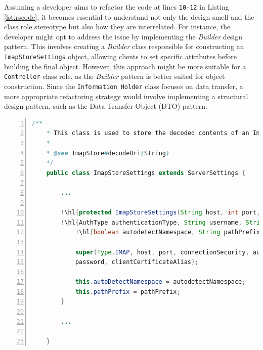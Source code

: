 \documentclass[AMA,Times1COL]{WileyNJDv5} %
\begin{document}
Assuming a developer aims to refactor the code at lines {\tt 10-12} in Listing \ref{lst:rscode}, it becomes essential to understand not only the design smell and the class role stereotype but also how they are interrelated. For instance, the developer might opt to address the issue by implementing the \textit{Builder} design pattern. This involves creating a \textit{Builder} class responsible for constructing an {\tt ImapStoreSettings} object, allowing clients to set specific attributes before building the final object. However, this approach might be more suitable for a {\tt Controller} class role, as the \textit{Builder} pattern is better suited for object construction. Since the {\tt Information Holder} class focuses on data transfer, a more appropriate refactoring strategy would involve implementing a structural design pattern, such as the Data Transfer Object (DTO) pattern.
 
	\begin{lstlisting}[language={java}, mathescape, backgroundcolor=\color{gray!10}, frame=trlb,caption={\footnotesize Code snippet of  {\tt ImapStoreStettings.java} IH class of K9 Mail project. Line {\tt 10-12} highlighted indicate a {\tt LongParameterList} design smell\label{lst:rscode}}, numbers=left, escapechar=!, tabsize=2, basicstyle=\ttfamily\footnotesize]
	/**
	* This class is used to store the decoded contents of an ImapStore URI.
	*
	* @see ImapStore#decodeUri(String)
	*/
	public class ImapStoreSettings extends ServerSettings {
		
		...
		
		!\hl{protected ImapStoreSettings(String host, int port, ConnectionSecurity connectionSecurity,}!
		!\hl{AuthType authenticationType, String username, String password, String clientCertificateAlias,}!
			!\hl{boolean autodetectNamespace, String pathPrefix)\{}!
			
			super(Type.IMAP, host, port, connectionSecurity, authenticationType, username,
			password, clientCertificateAlias);
			
			this.autoDetectNamespace = autodetectNamespace;
			this.pathPrefix = pathPrefix;
		}
		
		...
		
	}
\end{lstlisting}
\end{document}
